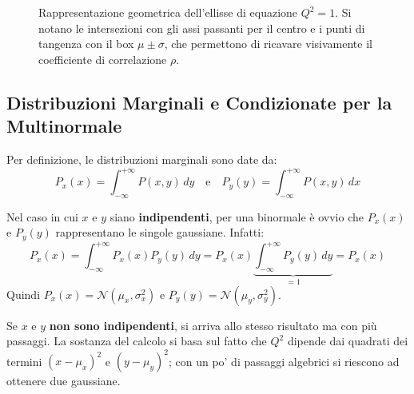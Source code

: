 \documentclass[openany,a4paper,12pt]{book}
\theoremstyle{remark}
\begin{document}
\begin{figure}[htbp]
\caption{Rappresentazione geometrica dell'ellisse di equazione $Q^2 = 1$. Si notano le intersezioni con gli assi passanti per il centro e i punti di tangenza con il box $\mu \pm \sigma$, che permettono di ricavare visivamente il coefficiente di correlazione $\rho$.}
\label{fig:ellisse_covarianza}
\end{figure}


\subsection*{Distribuzioni Marginali e Condizionate per la Multinormale}

Per definizione, le distribuzioni marginali sono date da:
\begin{equation}
P_x(x) = \int_{-\infty}^{+\infty} P(x,y) \, dy \quad \text{e} \quad P_y(y) = \int_{-\infty}^{+\infty} P(x,y) \, dx
\end{equation}

Nel caso in cui $x$ e $y$ siano \textbf{indipendenti}, per una binormale è ovvio che $P_x(x)$ e $P_y(y)$ rappresentano le singole gaussiane. Infatti:
\begin{equation*}
P_x(x) = \int_{-\infty}^{+\infty} P_x(x)P_y(y) \, dy = P_x(x) \underbrace{\int_{-\infty}^{+\infty} P_y(y) \, dy}_{=1} = P_x(x)
\end{equation*}
Quindi $P_x(x) = \mathcal{N}(\mu_x, \sigma_x^2)$ e $P_y(y) = \mathcal{N}(\mu_y, \sigma_y^2)$.

Se $x$ e $y$ \textbf{non sono indipendenti}, si arriva allo stesso risultato ma con più passaggi. La sostanza del calcolo si basa sul fatto che $Q^2$ dipende dai quadrati dei termini $(x-\mu_x)^2$ e $(y-\mu_y)^2$; con un po' di passaggi algebrici si riescono ad ottenere due gaussiane.
\end{document}

